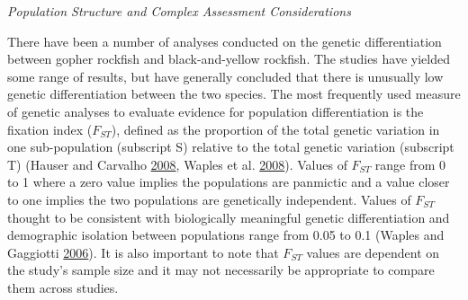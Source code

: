 \documentclass[12pt,]{article}
\begin{document}
\emph{Population Structure and Complex Assessment Considerations}

There have been a number of analyses conducted on the genetic
differentiation between gopher rockfish and black-and-yellow rockfish.
The studies have yielded some range of results, but have generally
concluded that there is unusually low genetic differentiation between
the two species. The most frequently used measure of genetic analyses to
evaluate evidence for population differentiation is the fixation index
(\(F_{ST}\)), defined as the proportion of the total genetic variation
in one sub-population (subscript S) relative to the total genetic
variation (subscript T) (Hauser and Carvalho
\protect\hyperlink{ref-Hauser2008}{2008}, Waples et al.
\protect\hyperlink{ref-Waples2008}{2008}). Values of \(F_{ST}\) range
from 0 to 1 where a zero value implies the populations are panmictic and
a value closer to one implies the two populations are genetically
independent. Values of \(F_{ST}\) thought to be consistent with
biologically meaningful genetic differentiation and demographic
isolation between populations range from 0.05 to 0.1 (Waples and
Gaggiotti \protect\hyperlink{ref-Waples2006}{2006}). It is also
important to note that \(F_{ST}\) values are dependent on the study's
sample size and it may not necessarily be appropriate to compare them
across studies.
\end{document}

